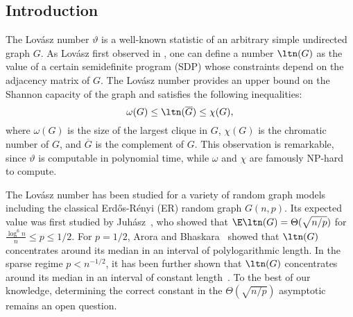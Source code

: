 \subsection{Introduction}
The Lovász number $\vartheta$ is a well-known statistic of an arbitrary simple undirected graph $G$. 
As Lovász first observed in \cite{lovasz1979shannon}, one can define a number $\ltn(G)$ 
as the value of a certain semidefinite program (SDP) 
whose constraints depend on the adjacency matrix of $G$.
The Lovász number provides an upper bound on the Shannon capacity of the graph and satisfies the following inequalities:
\begin{equation}
\label{eq:theta_ineq}
\omega(G) \leq \ltn(\overline{G}) \leq \chi(G),
\end{equation}
where $\omega(G)$ is the size of the largest clique in $G$, $\chi(G)$ is the chromatic number of $G$, and $\overline{G}$ is the complement of $G$. 
This observation is remarkable, since $\vartheta$ is computable in polynomial time, while $\omega$ and $\chi$ are famously NP-hard to compute. 

The Lovász number has been studied for a variety of random graph models including the classical Erd\H{o}s-R\'{e}nyi (ER) random graph $G(n, p)$. 
Its expected value was first studied by Juh{\'a}sz~\cite{juhasz1982asymptotic}, 
who showed that $\E \ltn(G) = \Theta(\sqrt{n/p})$ for $\frac{\log^6 n}{n} \le p \le 1/2$. 
For $p=1/2$, Arora and Bhaskara~\cite{aroranote} showed that \(\ltn(G)\) concentrates around its median in an interval of polylogarithmic length.
In the sparse regime $p < n^{-1/2}$, it has been further shown that \(\ltn(G)\) concentrates around its median in an interval of constant length~\cite{coja2005lovasz}.
To the best of our knowledge, determining the correct constant in the $\Theta(\sqrt{n/p})$ asymptotic remains an open question. 

